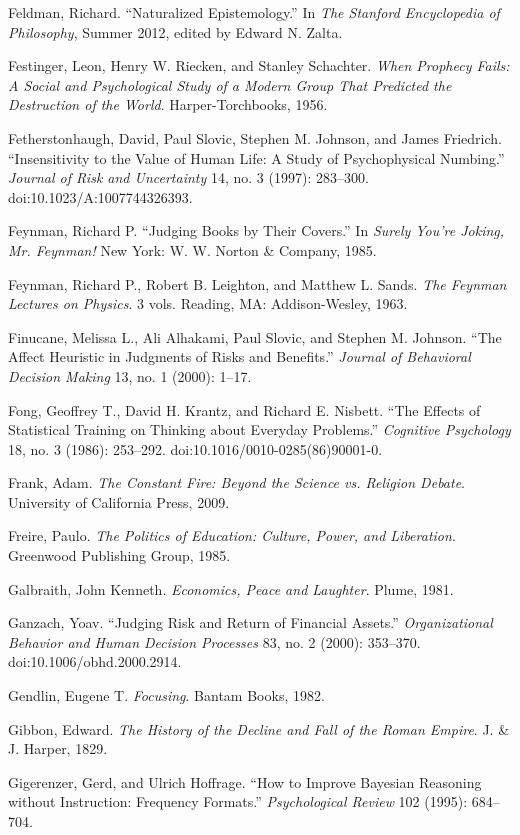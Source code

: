 \documentclass[letterpaper]{book}
\begin{document}
{
 Feldman, Richard. ``Naturalized
Epistemology.'' In \textit{The Stanford Encyclopedia
of Philosophy}, Summer 2012, edited by Edward N. Zalta.}

{
 Festinger, Leon, Henry W. Riecken, and Stanley Schachter.
\textit{When Prophecy Fails: A Social and Psychological Study of a
Modern Group That Predicted the Destruction of the World}.
Harper-Torchbooks, 1956.}

{
 Fetherstonhaugh, David, Paul Slovic, Stephen M. Johnson, and James
Friedrich. ``Insensitivity to the Value of Human Life:
A Study of Psychophysical Numbing.'' \textit{Journal
of Risk and Uncertainty} 14, no. 3 (1997): 283--300.
doi:10.1023/A:1007744326393.}

{
 Feynman, Richard P. ``Judging Books by Their
Covers.'' In \textit{Surely You're
Joking, Mr. Feynman!} New York: W. W. Norton \& Company, 1985.}

{
 Feynman, Richard P., Robert B. Leighton, and Matthew L. Sands.
\textit{The Feynman Lectures on Physics}. 3 vols. Reading, MA:
Addison-Wesley, 1963.}

{
 Finucane, Melissa L., Ali Alhakami, Paul Slovic, and Stephen M.
Johnson. ``The Affect Heuristic in Judgments of Risks
and Benefits.'' \textit{Journal of Behavioral
Decision Making} 13, no. 1 (2000): 1--17.}

{
 Fong, Geoffrey T., David H. Krantz, and Richard E. Nisbett.
``The Effects of Statistical Training on Thinking
about Everyday Problems.'' \textit{Cognitive
Psychology} 18, no. 3 (1986): 253--292.
doi:10.1016/0010-0285(86)90001-0.}

{
 Frank, Adam. \textit{The Constant Fire: Beyond the Science vs.
Religion Debate}. University of California Press, 2009.}

{
 Freire, Paulo. \textit{The Politics of Education: Culture, Power,
and Liberation}. Greenwood Publishing Group, 1985.}

{
 Galbraith, John Kenneth. \textit{Economics, Peace and Laughter}.
Plume, 1981.}

{
 Ganzach, Yoav. ``Judging Risk and Return of
Financial Assets.'' \textit{Organizational Behavior
and Human Decision Processes} 83, no. 2 (2000): 353--370.
doi:10.1006/obhd.2000.2914.}

{
 Gendlin, Eugene T. \textit{Focusing}. Bantam Books, 1982.}

{
 Gibbon, Edward. \textit{The History of the Decline and Fall of the
Roman Empire}. J. \& J. Harper, 1829.}

{
 Gigerenzer, Gerd, and Ulrich Hoffrage. ``How to
Improve Bayesian Reasoning without Instruction: Frequency
Formats.'' \textit{Psychological Review} 102 (1995):
684--704.}
\end{document}
